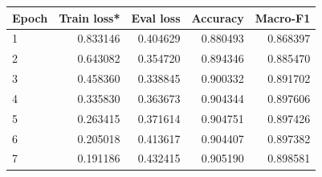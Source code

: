 \begin{tabularx}{\textwidth}{Xrrrr}\toprule
Epoch & Train loss* & Eval loss & Accuracy & Macro-F1\\\midrule
1 & 0.833146 & 0.404629 & 0.880493 & 0.868397\\
2 & 0.643082 & 0.354720 & 0.894346 & 0.885470\\
3 & 0.458360 & 0.338845 & 0.900332 & 0.891702\\
4 & 0.335830 & 0.363673 & 0.904344 & 0.897606\\
5 & 0.263415 & 0.371614 & 0.904751 & 0.897426\\
6 & 0.205018 & 0.413617 & 0.904407 & 0.897382\\
7 & 0.191186 & 0.432415 & 0.905190 & 0.898581\\
\bottomrule\end{tabularx}
